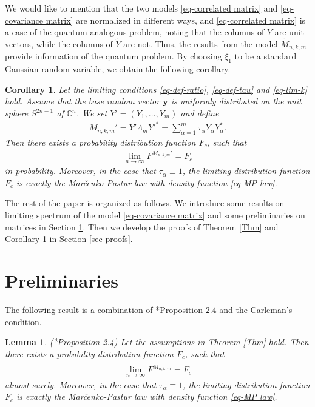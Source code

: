 \documentclass[12pt]{article}
\numberwithin{equation}{section} \theoremstyle{plain}
\newtheorem{lemma}{Lemma}[section]
\newtheorem{corollary}{Corollary}[section]
\def\bC{\mathbb C}
\def\y{\mathbf y}
\begin{document}
We would like to mention that the two models \eqref{eq-correlated matrix} and \eqref{eq-covariance matrix} are normalized in different ways, and \eqref{eq-correlated matrix} is a case of the quantum analogous problem, noting that the columns of $Y$ are unit vectors, while the columns of $\widetilde Y$ are not.
Thus, the results from the model $\widetilde M_{n,k,m}$ provide information of the quantum problem.
By choosing $\xi_1$ to be a standard Gaussian random variable, we obtain the following corollary.

\begin{corollary} \label{Coro}
Let the limiting conditions \eqref{eq-def-ratio}, \eqref{eq-def-tau} and \eqref{eq-lim-k} hold. Assume that the base random vector $\y$ is uniformly distributed on the unit sphere $S^{2n-1}$ of $\bC^n$. We set $Y' = (Y_1,\ldots,Y_m)$ and define
\begin{align*}
    M_{n,k,m}' = Y' \Lambda_m Y'^* = \sum_{\alpha=1}^m \tau_\alpha Y_\alpha Y_\alpha^*.
\end{align*}
Then there exists a probability distribution function $F_c$, such that
\begin{align*}
    \lim_{n \to \infty} F^{M_{n,k,m}'} = F_c
\end{align*}
in probability.
Moreover, in the case that $\tau_\alpha \equiv 1$, the limiting distribution function $F_c$ is exactly the Mar\v{c}enko-Pastur law with density function \eqref{eq-MP law}.
\end{corollary}

The rest of the paper is organized as follows. We introduce some results on limiting spectrum of the model \eqref{eq-covariance matrix} and some preliminaries on matrices in Section \ref{sec-preliminary}. Then we develop the proofs of Theorem \ref{Thm} and Corollary \ref{Coro} in Section \ref{sec-proofs}.


\section{Preliminaries} \label{sec-preliminary}

The following result is a combination of \cite{BYY2022}*{Proposition 2.4} and the Carleman’s condition.

\begin{lemma} (\cite{BYY2022}*{Proposition 2.4}) \label{Lem-LSD-M}
Let the assumptions in Theorem \ref{Thm} hold. Then there exists a probability distribution function $F_c$, such that
\begin{align*}
    \lim_{n \to \infty} F^{\widetilde M_{n,k,m}} = F_c
\end{align*}
almost surely.
Moreover, in the case that $\tau_\alpha \equiv 1$, the limiting distribution function $F_c$ is exactly the Mar\v{c}enko-Pastur law with density function \eqref{eq-MP law}.
\end{lemma}
\end{document}

